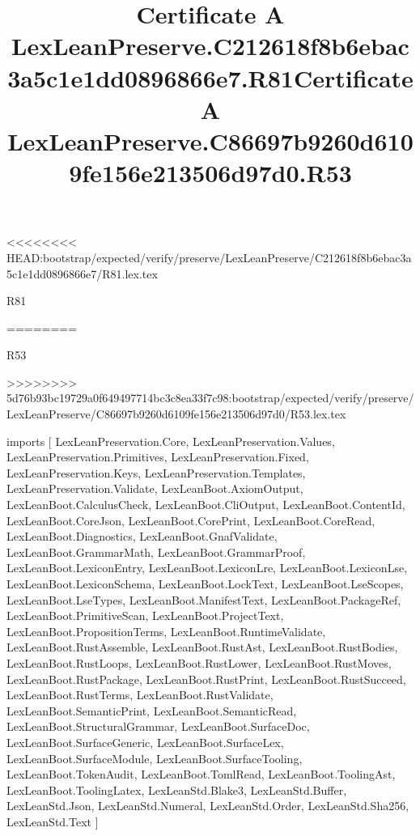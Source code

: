 <<<<<<<< HEAD:bootstrap/expected/verify/preserve/LexLeanPreserve/C212618f8b6ebac3a5c1e1dd0896866e7/R81.lex.tex
\begin{lexlean}{R81}
\title{Certificate A LexLeanPreserve.C212618f8b6ebac3a5c1e1dd0896866e7.R81}
========
\begin{lexlean}{R53}
\title{Certificate A LexLeanPreserve.C86697b9260d6109fe156e213506d97d0.R53}
>>>>>>>> 5d76b93bc19729a0f649497714bc3c8ea33f7c98:bootstrap/expected/verify/preserve/LexLeanPreserve/C86697b9260d6109fe156e213506d97d0/R53.lex.tex
\begin{coremodule}
imports [
  LexLeanPreservation.Core,
  LexLeanPreservation.Values,
  LexLeanPreservation.Primitives,
  LexLeanPreservation.Fixed,
  LexLeanPreservation.Keys,
  LexLeanPreservation.Templates,
  LexLeanPreservation.Validate,
  LexLeanBoot.AxiomOutput,
  LexLeanBoot.CalculusCheck,
  LexLeanBoot.CliOutput,
  LexLeanBoot.ContentId,
  LexLeanBoot.CoreJson,
  LexLeanBoot.CorePrint,
  LexLeanBoot.CoreRead,
  LexLeanBoot.Diagnostics,
  LexLeanBoot.GnafValidate,
  LexLeanBoot.GrammarMath,
  LexLeanBoot.GrammarProof,
  LexLeanBoot.LexiconEntry,
  LexLeanBoot.LexiconLre,
  LexLeanBoot.LexiconLse,
  LexLeanBoot.LexiconSchema,
  LexLeanBoot.LockText,
  LexLeanBoot.LseScopes,
  LexLeanBoot.LseTypes,
  LexLeanBoot.ManifestText,
  LexLeanBoot.PackageRef,
  LexLeanBoot.PrimitiveScan,
  LexLeanBoot.ProjectText,
  LexLeanBoot.PropositionTerms,
  LexLeanBoot.RuntimeValidate,
  LexLeanBoot.RustAssemble,
  LexLeanBoot.RustAst,
  LexLeanBoot.RustBodies,
  LexLeanBoot.RustLoops,
  LexLeanBoot.RustLower,
  LexLeanBoot.RustMoves,
  LexLeanBoot.RustPackage,
  LexLeanBoot.RustPrint,
  LexLeanBoot.RustSucceed,
  LexLeanBoot.RustTerms,
  LexLeanBoot.RustValidate,
  LexLeanBoot.SemanticPrint,
  LexLeanBoot.SemanticRead,
  LexLeanBoot.StructuralGrammar,
  LexLeanBoot.SurfaceDoc,
  LexLeanBoot.SurfaceGeneric,
  LexLeanBoot.SurfaceLex,
  LexLeanBoot.SurfaceModule,
  LexLeanBoot.SurfaceTooling,
  LexLeanBoot.TokenAudit,
  LexLeanBoot.TomlRead,
  LexLeanBoot.ToolingAst,
  LexLeanBoot.ToolingLatex,
  LexLeanStd.Blake3,
  LexLeanStd.Buffer,
  LexLeanStd.Json,
  LexLeanStd.Numeral,
  LexLeanStd.Order,
  LexLeanStd.Sha256,
  LexLeanStd.Text
]


\end{coremodule}
\end{lexlean}
\end{lexlean}
